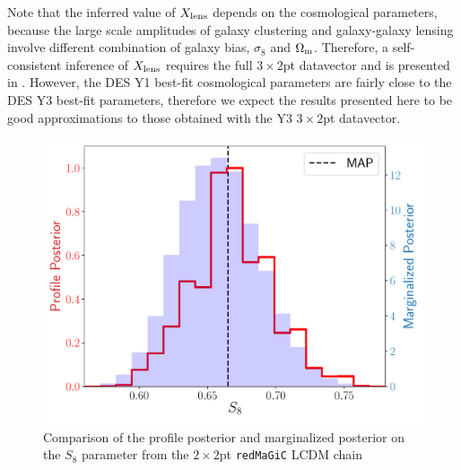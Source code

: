 \documentclass[aps, prd,twocolumn,superscriptaddress,nofootinbib,preprintnumbers]{revtex4-1}
\newcommand{\redmagic}{\texttt{redMaGiC} }
\begin{document}
Note that the inferred value of $X_{\rm lens}$ depends on the cosmological parameters, because the large scale amplitudes of galaxy clustering and galaxy-galaxy lensing involve different combination of galaxy bias, $\sigma_8$ and $\Omega_{\rm m}$. Therefore, a self-consistent inference of $X_{\rm lens}$ requires the full $3\times2$pt datavector and is presented in \citet*{y3-3x2ptkp}. However, the DES Y1 best-fit cosmological parameters are fairly close to the DES Y3 best-fit parameters, therefore we expect  the results presented here to be good approximations to those obtained with the Y3 $3\times2$pt datavector. 




\begin{figure}
\includegraphics[width=\columnwidth]{figs/profile_likelihood_emcee.pdf}
\caption[]{Comparison of the profile posterior and marginalized posterior on the $S_8$ parameter from the $2\times2$pt \redmagic LCDM chain}
\label{fig:prof_like}
\end{figure}
\end{document}
